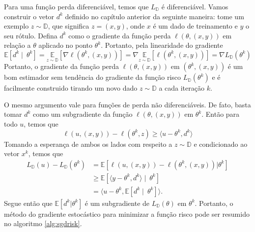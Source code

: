 \documentclass[
	12pt,				%
    oneside,			%
	a4paper,			%
	english,			%
	french,				%
	spanish,			%
	brazil,				%
	]{abntex2}
\begin{document}
           Para uma função perda diferenciável, temos que $L_\mathbb{D}$ é diferenciável. Vamos construir o vetor $d^k$ definido no capítulo anterior da seguinte maneira: tome um exemplo $z \sim \mathbb{D}$, que significa $z = (x,y)$, onde $x$ é um dado de treinamento e $y$ o seu rótulo. Defina $d^k$ como o gradiente da função perda $\ell(\theta,(x,y))$ em relação a $\theta$ aplicado no ponto $\theta^k$.
           Portanto, pela linearidade do gradiente
            \begin{equation*}
                \mathbb{E}[d^k \mid\ \theta^k] = \underset{z\sim \mathbb{D}}{\mathbb{E}}[\nabla \ell(\theta^k,(x,y))] = \nabla \underset{z\sim \mathbb{D}}{\mathbb{E}}[\ell(\theta^k,(x,y))] = \nabla L_\mathbb{D}(\theta^k)
            \end{equation*}
            Portanto, o gradiente da função perda $\ell(\theta,(x,y))$ em $(\theta^k,(x,y))$ é um bom estimador sem tendência do gradiente da função risco $L_\mathbb{D}(\theta^k)$ e é facilmente construido tirando um novo dado $z \sim \mathbb{D}$ a cada iteração $k$.

            O mesmo argumento vale para funções de perda não diferenciáveis. De fato, basta tomar $d^k$ como um subgradiente da função $\ell(\theta,(x,y))$ em $\theta^k$. Então para todo $u$, temos que
            \begin{equation*}
                \ell(u,(x,y)) - \ell(\theta^k, z) \geq \langle u-\theta^k, d^k \rangle
            \end{equation*}
            Tomando a esperança de ambos os lados com respeito a $z \sim \mathbb{D}$ e condicionado ao vetor $x^k$, temos que
            \begin{align*}
                L_\mathbb{D}(u) - L_\mathbb{D}(\theta^k) &= \mathbb{E}\left[\ell(u,(x,y)) - \ell(\theta^k, (x,y)) | \theta^k\right] \\
                &\geq \mathbb{E}\left[\langle y-\theta^k, d^k\rangle \mid\ \theta^k\right] \\
                &= \langle u-\theta^k, \mathbb{E}\left[d^k \mid\ \theta^k\right]\rangle.
            \end{align*}
            Segue então que $\mathbb{E}\left[d^k|\theta^k\right]$ é um subgradiente de $L_\mathbb{D}(\theta)$ em $\theta^k$. Portanto, o método do gradiente estocástico para minimizar a função risco pode ser resumido no algoritmo \ref{alg:sgdrisk}.
\end{document}
